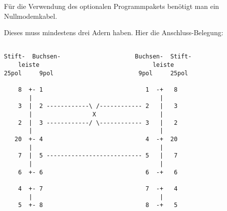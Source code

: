 
    Für die Verwendung des optionalen Programmpakets 
    benötigt man ein Null\-modem\-kabel.

    Dieses muss mindestens drei Adern haben. Hier die Anschluss-Belegung:

\begin{example}
%
\begin{verbatim}

Stift-  Buchsen-                     Buchsen-  Stift-
    leiste                                leiste
25pol     9pol                        9pol     25pol

    8  +- 1                             1  -+   8
       |                                    |
    3  |  2 ------------\ /------------ 2   |   3
       |                 X                  |
    2  |  3 ------------/ \------------ 3   |   2
       |                                    |
   20  +- 4                             4  -+  20
       |                                    |
    7  |  5 --------------------------- 5   |   7
       |                                    |
    6  +- 6                             6  -+   6

    4  +- 7                             7  -+   4
       |                                    |
    5  +- 8                             8  -+   5


\end{verbatim}
\end{example}



